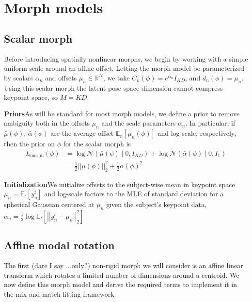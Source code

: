 \documentclass{article}         %
\newcommand{\EE}{\mathbb{E}}
\newcommand{\RR}{\mathbb{R}}
\newcommand{\NN}{\mathcal{N}}
\newcommand{\norm}[1]{\left|\left| #1 \right|\right|}
\newcommand{\pn}[1]{\left( #1 \right)}
\newcommand{\bc}[1]{\left[ #1 \right]}
\begin{document}
\section{Morph models}

\subsection{Scalar morph}

Before introducing spatially nonlinear morphs, we begin by working with a simple uniform scale around an affine offset. Letting the morph model be parameterized by scalars $\alpha_n$ and offsets $\mu_n\in \RR^N$, we take $C_n(\phi) = e^{\alpha_n} I_{KD}$, and $d_n(\phi) = \mu_n$. Using this scalar morph the latent pose space dimension cannot compress keypoint space, so $M = KD$.

\textbf{Priors}\quad As will be standard for most morph models, we define a prior to remove ambiguity both in the offsets $\mu_n$ and the scale parameters $\alpha_n$. In particular, if $\bar{\mu}(\phi)$, $\bar{\alpha}(\phi)$ are the average offset $\EE_n\bc{\mu_n(\phi)}$ and log-scale, respectively, then the prior on $\phi$ for the scalar morph is
\begin{align}
    L_{\text{morph}}(\phi) &= \log \NN\pn{\bar{\mu}(\phi) \mid 0, I_{KD}} + \log \NN\pn{\bar{\alpha}(\phi) \mid 0, I_1} \\
    &= \frac{1}{2}\norm{\bar{\mu}(\phi)}_2^2 + \frac{1}{2}\bar{\alpha}(\phi)^2
    \label{eq:d-alpha-prior}
\end{align}

\textbf{Initialization}\quad We initialize offsets to the subject-wise mean in keypoint space $\mu_n = \EE_t[y^t_n]$ and log-scale factors to the MLE of standard deviation for a spherical Gaussian centered at $\mu_n$ given the subject's keypoint data, $\alpha_n = \frac{1}{2}\log\EE_t[\norm{y^t_n - \mu_n}_2^2]$

\subsection{Affine modal rotation}

The first (dare I say ...only?) non-rigid morph we will consider is an affine linear transform which rotates a limited number of dimensions around a centroid. We now define this morph model and derive the required terms to implement it in the mix-and-match fitting framework.
\end{document}
